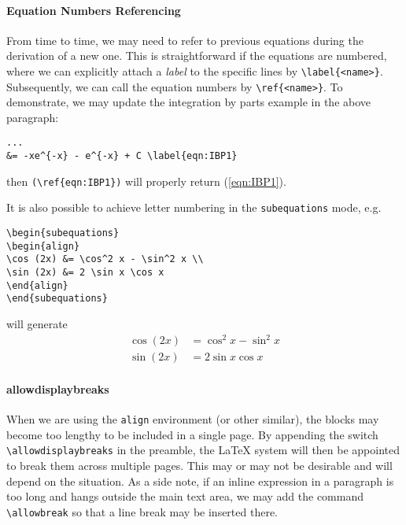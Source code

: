 \paragraph{Equation Numbers Referencing}
From time to time, we may need to refer to previous equations during the derivation of a new one. This is straightforward if the equations are numbered, where we can explicitly attach a \textit{label} to the specific lines by \texttt{\textbackslash label\{<name>\}}. Subsequently, we can call the equation numbers by \texttt{\textbackslash ref\{<name>\}}. To demonstrate, we may update the integration by parts example in the above paragraph:
\begin{lstlisting}
...
&= -xe^{-x} - e^{-x} + C \label{eqn:IBP1}
\end{lstlisting}
then \texttt{(\textbackslash ref\{eqn:IBP1\})} will properly return (\ref{eqn:IBP1}).

It is also possible to achieve letter numbering in the \texttt{subequations} mode, e.g.\
\begin{lstlisting}
\begin{subequations}
\begin{align}
\cos (2x) &= \cos^2 x - \sin^2 x \\
\sin (2x) &= 2 \sin x \cos x
\end{align}
\end{subequations}
\end{lstlisting}
will generate
\begin{subequations}
\begin{align}
\cos (2x) &= \cos^2 x - \sin^2 x \\
\sin (2x) &= 2 \sin x \cos x
\end{align}
\end{subequations}

\paragraph{allowdisplaybreaks}
When we are using the \texttt{align} environment (or other similar), the blocks may become too lengthy to be included in a single page. By appending the switch \texttt{\textbackslash allowdisplaybreaks} in the preamble, the \LaTeX{} system will then be appointed to break them across multiple pages. This may or may not be desirable and will depend on the situation. As a side note, if an inline expression in a paragraph is too long and hangs outside the main text area, we may add the command \texttt{\textbackslash allowbreak} so that a line break may be inserted there.

